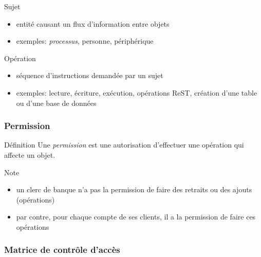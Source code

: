 \begin{reveals}
\begin{frame}
  \vfill

   \begin{block}{Sujet}
     \begin{itemize}
     \item entité causant un flux d'information entre objets
     \item exemples: \emph{processus}, personne, périphérique
     \end{itemize}
  \end{block}

  \vfill

   \begin{block}{Opération}
     \begin{itemize}
     \item séquence d'instructions demandée par un sujet
     \item exemples: lecture, écriture, exécution, opérations ReST,
       création d'une table ou d'une base de données
     \end{itemize}
  \end{block}

  \vfill


\end{frame}

\begin{frame}
  \frametitle{Permission}

  \vfill

   \begin{block}{Définition}
     Une \emph{permission} est une autorisation d'effectuer une
     opération qui affecte un objet.
  \end{block}

  \vfill

  \begin{block}{Note}
    \begin{itemize}
    \item un clerc de banque n'a pas la permission de faire des
      retraits ou des ajouts (opérations)
    \item par contre, pour chaque compte de ses clients, il a la
      permission de faire ces opérations
    \end{itemize}
  \end{block}

  \vfill



\end{frame}

\begin{frame}
  \frametitle{Matrice de contrôle d'accès}


\end{frame}
\end{reveals}

